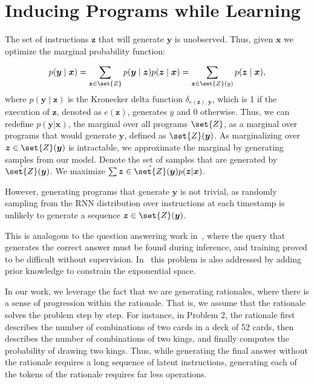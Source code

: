 \section{Inducing Programs while Learning}
\label{sec:program_induction}

The set of instructions $\boldsymbol{z}$ that will generate $\boldsymbol{y}$ is unobserved. Thus, given $\boldsymbol{x}$ we optimize the marginal probability function:

\begin{align*}
p(\boldsymbol{y}\mid \boldsymbol{x}) = \sum_{\boldsymbol{z} \in \set{Z}} p(\boldsymbol{y}\mid \boldsymbol{z}) p(\boldsymbol{z} \mid \boldsymbol{x}) = \sum_{\boldsymbol{z} \in \set{Z}(y)} p(\boldsymbol{z} \mid \boldsymbol{x}),
\end{align*}
where $p(\boldsymbol{y} \mid \boldsymbol{z})$ is the Kronecker delta function $\delta_{e(\boldsymbol{z}),\boldsymbol{y}}$, which is 1 if the execution of $\boldsymbol{z}$, denoted as $e(\boldsymbol{z})$, generates $y$ and 0 otherwise. Thus, we can redefine $p(\boldsymbol{y}|\boldsymbol{x})$, the marginal over all programs $\set{Z}$, as a marginal over programs that would generate $\boldsymbol{y}$, defined as $\set{Z}(\boldsymbol{y})$. As marginalizing over $\boldsymbol{z}\in \set{Z}(\boldsymbol{y})$ is intractable, we approximate the marginal by generating samples from our model. Denote the set of samples that
are generated by $\hat{\set{Z}}(\boldsymbol{y})$. We maximize $\sum{\boldsymbol{z} \in \hat{\set{Z}}(\boldsymbol{y})} p(\boldsymbol{z}|\boldsymbol{x})$.

However, generating programs that generate $\boldsymbol{y}$ is not trivial, as randomly sampling from the RNN distribution over instructions at each timestamp is unlikely to generate a sequence $\boldsymbol{z}\in \set{Z}(\boldsymbol{y})$.

This is analogous to the question answering work in~, where the query that generates the correct answer must be found during inference, and training proved to be difficult without supervision. In~ this problem is also addressed by adding prior knowledge to constrain the exponential space. 

In our work, we leverage the fact that we are generating rationales, where there is a sense of progression within the rationale. That is, we assume that the rationale solves the problem step by step. For instance, in Problem 2, the rationale first describes the number of combinations of two cards in a deck of 52 cards, then describes the number of combinations of  two kings, and finally computes the probability of drawing two kings. Thus, while generating the final answer without the rationale requires a long sequence of latent instructions, generating each of the tokens of the rationale requires far less operations. 

